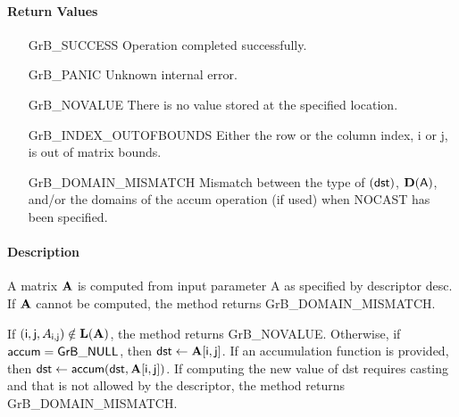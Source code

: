 \paragraph{Return Values}

\begin{itemize}[leftmargin=2.1in]
\item[{\sf GrB\_SUCCESS}]             Operation completed successfully.
\item[{\sf GrB\_PANIC}]               Unknown internal error.
\item[{\sf GrB\_NOVALUE}]             There is no value stored at the specified location.
\item[{\sf GrB\_INDEX\_OUTOFBOUNDS}]  Either the row or the column index,
                                      {\sf i} or {\sf j}, is out of matrix bounds.
\item[{\sf GrB\_DOMAIN\_MISMATCH}]    Mismatch between the type of $(\sf dst)$, 
                                      $\bold{D}({\sf A})$, and/or the domains of the 
                                      {\sf accum} operation (if used) when {\sf NOCAST} has
                                      been specified.
\end{itemize}

\paragraph{Description}

A matrix ${\bf A}$ is computed from input parameter {\sf A} as specified by descriptor {\sf desc}.
If ${\bf A}$ cannot be computed, the method returns {\sf GrB\_DOMAIN\_MISMATCH}.

If $({\sf i},{\sf j}, A_{{\sf i},{\sf j}}) \notin \bold{L}({\bf A})$, 
the method returns {\sf GrB\_NOVALUE}.  Otherwise, if 
${\sf accum} = {\sf GrB\_NULL}$, then ${\sf dst} \leftarrow {\bf A}[{\sf i},{\sf j}]$.
If an accumulation function is provided, then 
${\sf dst} \leftarrow {\sf accum}({\sf dst},{\bf A}[{\sf i},{\sf j}])$.
If computing the new value of {\sf dst} requires casting and that is not allowed 
by the descriptor, the method returns {\sf GrB\_DOMAIN\_MISMATCH}.
